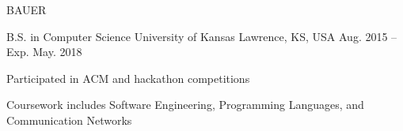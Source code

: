 \documentclass[11pt]{resume}
\begin{document}
\makecvheader[C]

\makecvfooter
  {BAUER}
  {\thepage}
  {\pageref{LastPage}}




\begin{cventries}
  \cventry
    {B.S. in Computer Science}
    {University of Kansas}
    {Lawrence, KS, USA}
    {Aug. 2015 – Exp. May. 2018}
    {
      \begin{cvitems}
      \item { Participated in ACM and hackathon competitions }
      \item { Coursework includes Software Engineering, Programming Languages,
          and Communication Networks }
      \end{cvitems}
    }

\end{cventries}

\end{document}
